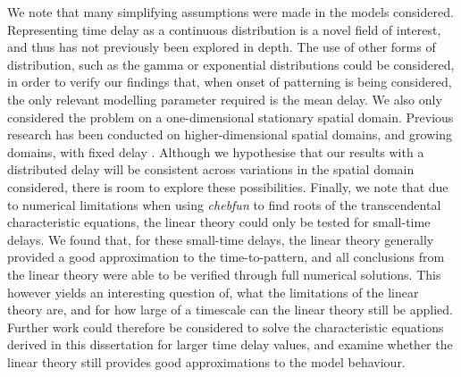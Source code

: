 We note that many simplifying assumptions were made in the models considered. Representing time delay as a continuous distribution is a novel field of interest, and thus has not previously been explored in depth. The use of other forms of distribution, such as the gamma or exponential distributions could be considered, in order to verify our findings that, when onset of patterning is being considered, the only relevant modelling parameter required is the mean delay. We also only considered the problem on a one-dimensional stationary spatial domain. Previous research has been conducted on higher-dimensional spatial domains, and growing domains, with fixed delay \cite{gaffmonk,krausefixed}. Although we hypothesise that our results with a distributed delay will be consistent across variations in the spatial domain considered, there is room to explore these possibilities. Finally, we note that due to numerical limitations when using \textit{chebfun} to find roots of the transcendental characteristic equations, the linear theory could only be tested for small-time delays. We found that, for these small-time delays, the linear theory generally provided a good approximation to the time-to-pattern, and all conclusions from the linear theory were able to be verified through full numerical solutions. This however yields an interesting question of, what the limitations of the linear theory are, and for how large of a timescale can the linear theory still be applied. Further work could therefore be considered to solve the characteristic equations derived in this dissertation for larger time delay values, and examine whether the linear theory still provides good approximations to the model behaviour.
